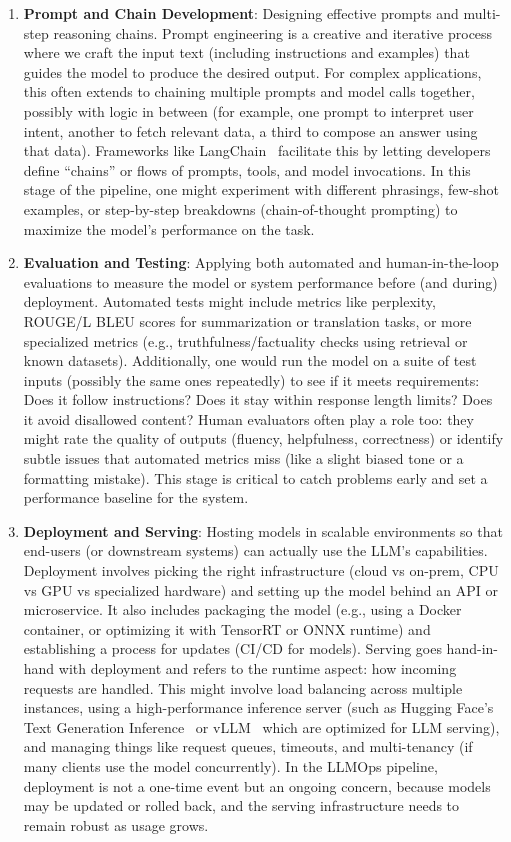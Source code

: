 \begin{enumerate}
\item \textbf{Prompt and Chain Development}: Designing effective prompts and multi-step reasoning chains. Prompt engineering is a creative and iterative process where we craft the input text (including instructions and examples) that guides the model to produce the desired output. For complex applications, this often extends to chaining multiple prompts and model calls together, possibly with logic in between (for example, one prompt to interpret user intent, another to fetch relevant data, a third to compose an answer using that data). Frameworks like LangChain~\cite{LangChain2023Framework} facilitate this by letting developers define “chains” or flows of prompts, tools, and model invocations. In this stage of the pipeline, one might experiment with different phrasings, few-shot examples, or step-by-step breakdowns (chain-of-thought prompting) to maximize the model’s performance on the task.

\item \textbf{Evaluation and Testing}: Applying both automated and human-in-the-loop evaluations to measure the model or system performance before (and during) deployment. Automated tests might include metrics like perplexity, ROUGE/L BLEU scores for summarization or translation tasks, or more specialized metrics (e.g., truthfulness/factuality checks using retrieval or known datasets). Additionally, one would run the model on a suite of test inputs (possibly the same ones repeatedly) to see if it meets requirements: Does it follow instructions? Does it stay within response length limits? Does it avoid disallowed content? Human evaluators often play a role too: they might rate the quality of outputs (fluency, helpfulness, correctness) or identify subtle issues that automated metrics miss (like a slight biased tone or a formatting mistake). This stage is critical to catch problems early and set a performance baseline for the system.

\item \textbf{Deployment and Serving}: Hosting models in scalable environments so that end-users (or downstream systems) can actually use the LLM’s capabilities. Deployment involves picking the right infrastructure (cloud vs on-prem, CPU vs GPU vs specialized hardware) and setting up the model behind an API or microservice. It also includes packaging the model (e.g., using a Docker container, or optimizing it with TensorRT or ONNX runtime) and establishing a process for updates (CI/CD for models). Serving goes hand-in-hand with deployment and refers to the runtime aspect: how incoming requests are handled. This might involve load balancing across multiple instances, using a high-performance inference server (such as Hugging Face’s Text Generation Inference~\cite{tgi-whitepaper} or vLLM~\cite{Kwon2023vLLM} which are optimized for LLM serving), and managing things like request queues, timeouts, and multi-tenancy (if many clients use the model concurrently). In the LLMOps pipeline, deployment is not a one-time event but an ongoing concern, because models may be updated or rolled back, and the serving infrastructure needs to remain robust as usage grows.


\end{enumerate}
